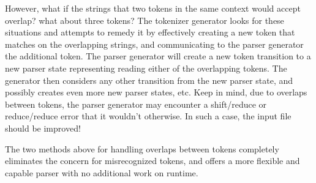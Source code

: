 {\begin{enumerate}
{			However, what if the strings that two tokens in the same context
			would accept overlap? what about three tokens?
			The tokenizer generator looks for these situations and attempts to
			remedy it by effectively creating a new token that matches on
			the overlapping strings, and communicating to the parser generator
			the additional token. The parser generator will create a new
			token transition to a new parser state representing reading either
			of the overlapping tokens. The generator then considers any other
			transition from the new parser state, and possibly creates even more
			new parser states, etc. Keep in mind, due to overlaps
			between tokens, the parser
			generator may encounter a shift/reduce or reduce/reduce error
			that it wouldn't otherwise. In such a case, the input file
			should be improved!
			
			The two methods above for handling overlaps between tokens
			completely eliminates the concern for misrecognized tokens,
			and offers a more flexible and capable parser with no additional
			work on runtime.
	}
	\end{enumerate}
	
}






















